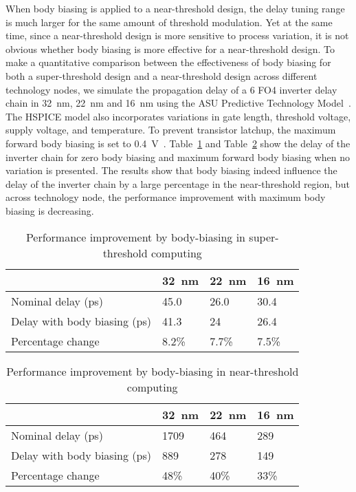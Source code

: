 When body biasing is applied to a near-threshold design, the delay tuning range is much larger for the same amount of threshold modulation.
Yet at the same time, since a near-threshold design is more sensitive to process variation, it is not obvious whether body biasing is more effective for a near-threshold design.
To make a quantitative comparison between the effectiveness of body biasing for both a super-threshold design and a near-threshold design across different technology nodes, we simulate the propagation delay of a 6 FO4 inverter delay chain in \SI{32}{\nano\meter}, \SI{22}{\nano\meter} and \SI{16}{\nano\meter} using the ASU Predictive Technology Model~\cite{PredictiveModel}.
The HSPICE model also incorporates variations in gate length, threshold voltage, supply voltage, and temperature.
To prevent transistor latchup, the maximum forward body biasing is set to \SI{0.4}{\volt}~\cite{BodyBiasing}.
Table~\ref{tbl:body1} and Table~\ref{tbl:body2} show the delay of the inverter chain for zero body biasing and maximum forward body biasing when no variation is presented.
The results show that body biasing indeed influence the delay of the inverter chain by a large percentage in the near-threshold region, but across technology node, the performance improvement with maximum body biasing is decreasing.

\begin{table}
  \caption{Performance improvement by body-biasing in super-threshold computing} 
  \centering 
  \label{tbl:body1}
  \begin{tabular}{ | l | l | l | l | }
    \hline
    & \SI{32}{\nano\meter} & \SI{22}{\nano\meter} & \SI{16}{\nano\meter} \\ \hline
    Nominal delay (ps) & 45.0 & 26.0 & 30.4 \\ \hline
    Delay with body biasing (ps)  & 41.3 & 24 & 26.4 \\  \hline
    Percentage change  & 8.2\% & 7.7\% & 7.5\% \\ 
    \hline
  \end{tabular}
\end{table}



\begin{table}
  \caption {Performance improvement by body-biasing in near-threshold computing}  
  \centering
  \label{tbl:body2}
  \begin{tabular}{ | l | l | l | l | }
    \hline
    & \SI{32}{\nano\meter} & \SI{22}{\nano\meter} & \SI{16}{\nano\meter} \\ \hline
    Nominal delay (ps) & 1709 & 464 & 289 \\ \hline
    Delay with body biasing (ps)  & 889 & 278 & 149 \\  \hline
    Percentage change  & 48\% & 40\% & 33\% \\ 
    \hline
  \end{tabular}
\end{table}

